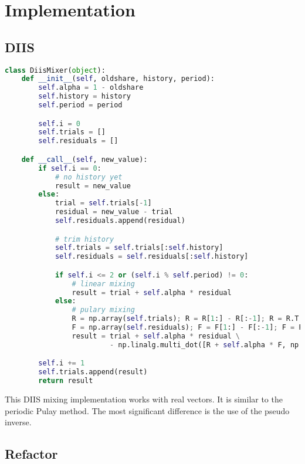 \chapter{Implementation}
\label{ch:impl}

\section{DIIS}

\begin{lstlisting}[label=lst:diis, language=python, caption=DIIS implementation]
class DiisMixer(object):
    def __init__(self, oldshare, history, period):
        self.alpha = 1 - oldshare
        self.history = history
        self.period = period

        self.i = 0
        self.trials = []
        self.residuals = []

    def __call__(self, new_value):
        if self.i == 0:
            # no history yet
            result = new_value
        else:
            trial = self.trials[-1]
            residual = new_value - trial
            self.residuals.append(residual)

            # trim history
            self.trials = self.trials[:self.history]
            self.residuals = self.residuals[:self.history]

            if self.i <= 2 or (self.i % self.period) != 0:
                # linear mixing
                result = trial + self.alpha * residual
            else:
                # pulary mixing
                R = np.array(self.trials); R = R[1:] - R[:-1]; R = R.T
                F = np.array(self.residuals); F = F[1:] - F[:-1]; F = F.T
                result = trial + self.alpha * residual \
                         - np.linalg.multi_dot([R + self.alpha * F, np.linalg.pinv(F), residual])

        self.i += 1
        self.trials.append(result)
        return result
\end{lstlisting}

This DIIS mixing implementation works with real vectors. It is similar to the periodic Pulay method\cite{diis_2}. The most significant difference is the use of the pseudo inverse.

\section{Refactor}

